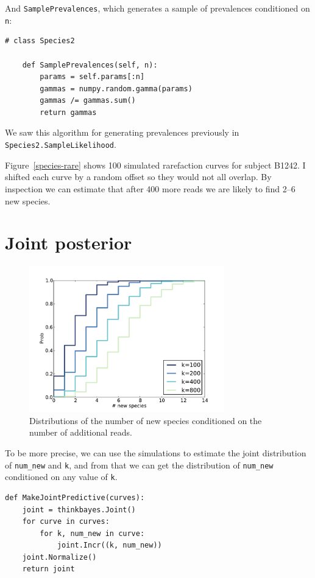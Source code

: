 \documentclass[12pt]{book}
\begin{document}
And {\tt SamplePrevalences}, which generates a sample of
prevalences conditioned on {\tt n}:

\begin{verbatim}
# class Species2

    def SamplePrevalences(self, n):
        params = self.params[:n]
        gammas = numpy.random.gamma(params)
        gammas /= gammas.sum()
        return gammas
\end{verbatim}

We saw this algorithm for generating prevalences previously
in {\tt Species2.SampleLikelihood}.

Figure~\ref{species-rare} shows 100 simulated rarefaction curves
for subject B1242.  I shifted each curve by a random offset so they
would not all overlap.  By inspection we can estimate that after
400 more reads we are likely to find 2--6 new species.


\section{Joint posterior}

\begin{figure}
\centerline{\includegraphics[height=2.5in]{figs/species-cond-B1242.pdf}}
\caption{Distributions of the number of new species conditioned on
the number of additional reads.}
\label{species-cond}
\end{figure}

To be more precise, we can use the simulations to estimate the
joint distribution of \verb"num_new" and {\tt k}, and from that
we can get the distribution of \verb"num_new" conditioned on any
value of {\tt k}.

\begin{verbatim}
def MakeJointPredictive(curves):
    joint = thinkbayes.Joint()
    for curve in curves:
        for k, num_new in curve:
            joint.Incr((k, num_new))
    joint.Normalize()
    return joint
\end{verbatim}
\end{document}
